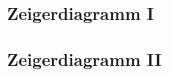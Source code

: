 \documentclass[8pt, aspectratio=43]{beamer}
\begin{document}
	

\begin{frame}\frametitle{Zeigerdiagramm I}

%		

\end{frame}


\begin{frame}\frametitle{Zeigerdiagramm II}



%	


\end{frame}

\end{document}
